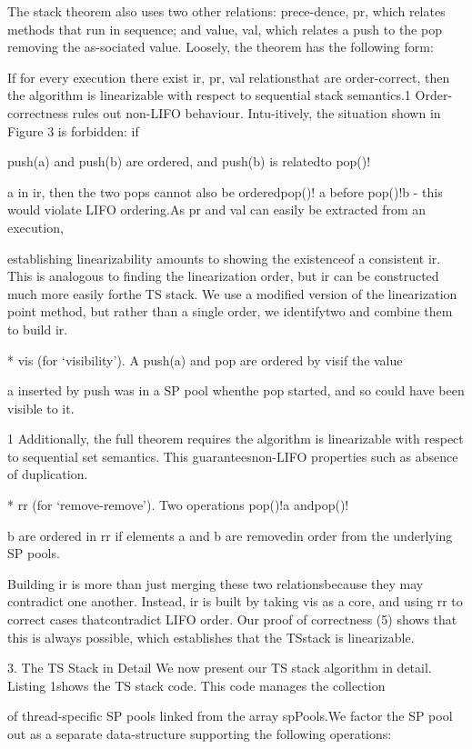 The stack theorem also uses two other relations: prece-dence, pr, which relates methods that run in sequence; and
value, val, which relates a push to the pop removing the as-sociated value. Loosely, the theorem has the following form:

If for every execution there exist ir, pr, val relationsthat are order-correct, then the algorithm is linearizable with respect to sequential stack semantics.1
Order-correctness rules out non-LIFO behaviour. Intu-itively, the situation shown in Figure 3 is forbidden: if

push(a) and push(b) are ordered, and push(b) is relatedto pop()!

a in ir, then the two pops cannot also be orderedpop()!
a before pop()!b - this would violate LIFO ordering.As pr and val can easily be extracted from an execution,

establishing linearizability amounts to showing the existenceof a consistent ir. This is analogous to finding the linearization order, but ir can be constructed much more easily forthe TS stack. We use a modified version of the linearization
point method, but rather than a single order, we identifytwo and combine them to build ir.

* vis (for `visibility'). A push(a) and pop are ordered by visif the value

a inserted by push was in a SP pool whenthe pop started, and so could have been visible to it.

1 Additionally, the full theorem requires the algorithm is linearizable with respect to sequential set semantics. This guaranteesnon-LIFO properties such as absence of duplication.

* rr (for `remove-remove'). Two operations pop()!a andpop()!

b are ordered in rr if elements a and b are removedin order from the underlying SP pools.

Building ir is more than just merging these two relationsbecause they may contradict one another. Instead, ir is built
by taking vis as a core, and using rr to correct cases thatcontradict LIFO order. Our proof of correctness (5) shows
that this is always possible, which establishes that the TSstack is linearizable.

3. The TS Stack in Detail
We now present our TS stack algorithm in detail. 
Listing 1shows the TS stack code. This code manages the collection

of thread-specific SP pools linked from the array spPools.We factor the SP pool out as a separate data-structure
supporting the following operations:


